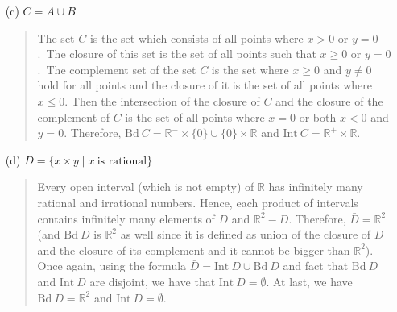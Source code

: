 \documentclass[12pt, a4paper]{article}
\newcommand{\reals}{\mathbb{R}} %
\newcommand{\preals}{\mathbb{R}^+} %
\newcommand{\nreals}{\mathbb{R}^-} %
\begin{document}
\begin{itemize}
\begin{itemize}
\item[]
\item[]

\item[(c)]
$C = A \cup B$
\begin{quote}
The set $C$ is the set which consists of all points where $x > 0$ or $y = 0$.\
The closure of this set is the set of all points such that $x \geq 0$ or $y = 0$.\
The complement set of the set $C$ is the set where $x \geq 0$ and $y \neq 0$ hold for all points
and the closure of it is the set of all points where $x \leq 0$. Then the intersection
of the closure of $C$ and the closure of the complement of $C$ is the set of all points
where $x = 0$ or both $x < 0$ and $y = 0$. Therefore, $\mbox{Bd} \ C = \nreals \times \{0\}
\cup \{0\} \times \reals$ and $\mbox{Int} \ C = \preals \times \reals$.
\end{quote}

\item[]
\item[]

\item[(d)]
$D = \{x \times y \mid x \ \mbox{is rational}\}$
\begin{quote}
Every open interval (which is not empty) of $\reals$ has infinitely many rational and
irrational numbers. Hence, each product of intervals contains infinitely many
elements of $D$ and $\reals^2 - D$. Therefore, $\bar{D} = \reals^2$ (and $\mbox{Bd} \ D$ is $\reals^2$ as
well since it is defined as union of the closure of $D$ and the closure of its complement and it cannot be bigger than $\reals^2$).
Once again, using the formula $\bar{D} = \mbox{Int} \ D \cup \mbox{Bd} \ D$ and fact that $\mbox{Bd} \ D$ and $\mbox{Int} \ D$ are disjoint,
we have that $\mbox{Int} \ D = \emptyset$. At last, we have $\mbox{Bd} \ D = \reals^2$
and $\mbox{Int} \ D = \emptyset$.

\end{quote}
\item[]
\item[]


\end{itemize}
\end{itemize}
\end{document}

